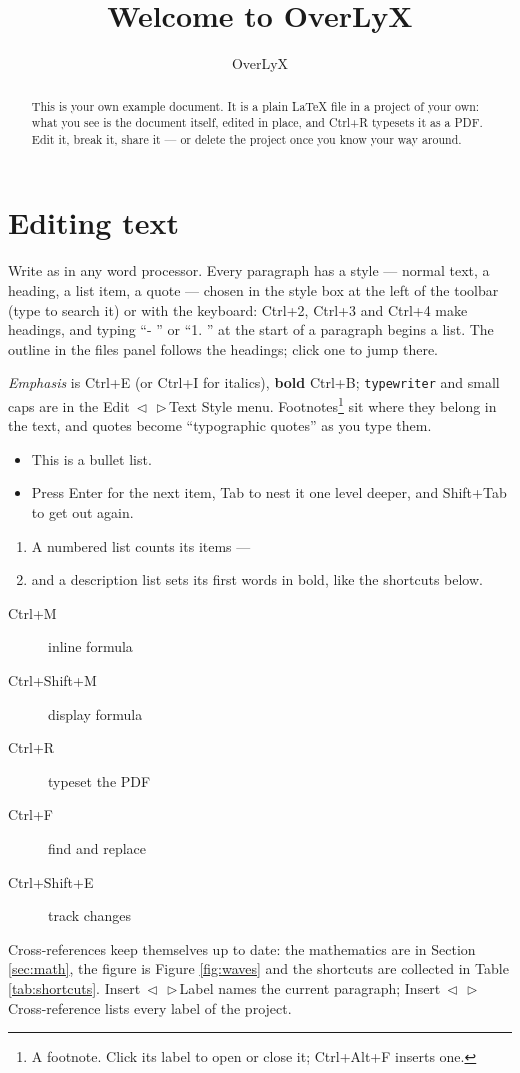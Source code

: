 \documentclass[english]{article}
\makeatletter
\DeclareRobustCommand*{\lyxarrow}{%
\@ifstar
{\leavevmode\,$\triangleleft$\,\allowbreak}
{\leavevmode\,$\triangleright$\,\allowbreak}}
\makeatother
\begin{document}
\title{Welcome to OverLyX}
\author{OverLyX}
\maketitle
\begin{abstract}
This is your own example document. It is a plain \LaTeX{} file in a project of your own: what you see is the document itself, edited in place, and \textsf{Ctrl+R} typesets it as a PDF. Edit it, break it, share it --- or delete the project once you know your way around.
\end{abstract}

\section{Editing text}\label{sec:text}

Write as in any word processor. Every paragraph has a style --- normal text, a heading, a list item, a quote --- chosen in the style box at the left of the toolbar (type to search it) or with the keyboard: \textsf{Ctrl+2}, \textsf{Ctrl+3} and \textsf{Ctrl+4} make headings, and typing ``- '' or ``1. '' at the start of a paragraph begins a list. The outline in the files panel follows the headings; click one to jump there.

\emph{Emphasis} is \textsf{Ctrl+E} (or \textsf{Ctrl+I} for italics), \textbf{bold} \textsf{Ctrl+B}; \texttt{typewriter} and small caps are in the Edit\lyxarrow Text Style menu. Footnotes\footnote{A footnote. Click its label to open or close it; \textsf{Ctrl+Alt+F} inserts one.} sit where they belong in the text, and quotes become ``typographic quotes'' as you type them.
\begin{itemize}
\item This is a bullet list.
\item Press\textsf{ Enter} for the next item, \textsf{Tab} to nest it one level deeper, and\textsf{ Shift+Tab} to get out again.
\end{itemize}
\begin{enumerate}
\item A numbered list counts its items ---
\item and a description list sets its first words in bold, like the shortcuts below.
\end{enumerate}
\begin{description}
\item [{Ctrl+M}] inline formula
\item [{Ctrl+Shift+M}] display formula
\item [{Ctrl+R}] typeset the PDF
\item [{Ctrl+F}] find and replace
\item [{Ctrl+Shift+E}] track changes
\end{description}
Cross-references keep themselves up to date: the mathematics are in Section \ref{sec:math}, the figure is Figure \ref{fig:waves} and the shortcuts are collected in Table \ref{tab:shortcuts}. Insert\lyxarrow Label names the current paragraph; Insert\lyxarrow Cross-reference lists every label of the project.
\end{document}
